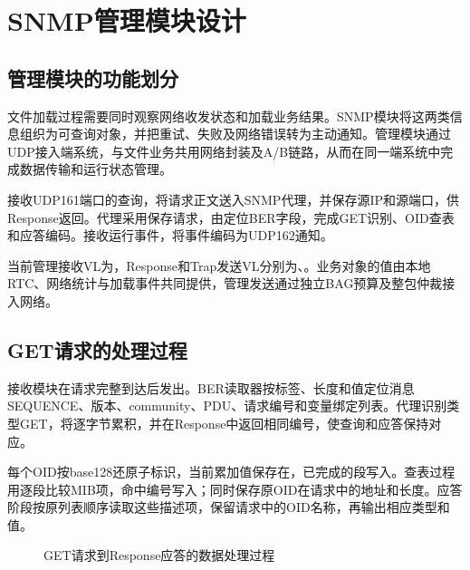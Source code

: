 \chapter{SNMP管理模块设计}
\section{管理模块的功能划分}
文件加载过程需要同时观察网络收发状态和加载业务结果。SNMP模块将这两类信息组织为可查询对象，并把重试、失败及网络错误转为主动通知。管理模块通过UDP接入端系统，与文件业务共用网络封装及A/B链路，从而在同一端系统中完成数据传输和运行状态管理。

接收UDP161端口的查询，将请求正文送入SNMP代理，并保存源IP和源端口，供Response返回。代理采用保存请求，由定位BER字段，完成GET识别、OID查表和应答编码。接收运行事件，将事件编码为UDP162通知。

当前管理接收VL为，Response和Trap发送VL分别为、。业务对象的值由本地RTC、网络统计与加载事件共同提供，管理发送通过独立BAG预算及整包仲裁接入网络。

\section{GET请求的处理过程}
接收模块在请求完整到达后发出。BER读取器按标签、长度和值定位消息SEQUENCE、版本、community、PDU、请求编号和变量绑定列表。代理识别类型GET，将逐字节累积，并在Response中返回相同编号，使查询和应答保持对应。

每个OID按base128还原子标识，当前累加值保存在，已完成的段写入。查表过程用逐段比较MIB项，命中编号写入；同时保存原OID在请求中的地址和长度。应答阶段按原列表顺序读取这些描述项，保留请求中的OID名称，再输出相应类型和值。

\begin{figure}[htbp]\centering
{}
\caption{GET请求到Response应答的数据处理过程}
\end{figure}

